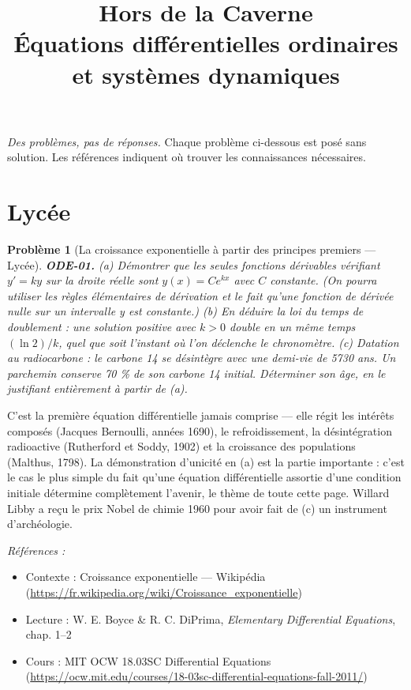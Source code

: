 \documentclass[11pt]{article}
\title{Hors de la Caverne \\ \Large Équations différentielles ordinaires et systèmes dynamiques}
\author{}
\date{}
\newtheorem{problem}{Problème}
\newenvironment{refs}{\par\small\noindent\emph{Références :}\begin{itemize}\setlength\itemsep{0pt}}{\end{itemize}\normalsize}
\begin{document}
\maketitle
\noindent\emph{Des problèmes, pas de réponses.} Chaque problème ci-dessous est posé
sans solution. Les références indiquent où trouver les connaissances nécessaires.
\medskip


\section*{Lycée}

\begin{problem}[{La croissance exponentielle à partir des principes premiers --- Lycée}]
\textbf{ODE-01.} (a) Démontrer que les \textit{seules} fonctions dérivables
vérifiant $ y' = k y $ sur la droite réelle sont $ y(x) = C e^{kx} $ avec $ C $ constante.
(On pourra utiliser les règles élémentaires de dérivation et le fait qu'une fonction de dérivée
nulle sur un intervalle y est constante.)
(b) En déduire la loi du temps de doublement : une solution positive avec $ k >0 $ double en
un même temps $ (\ln 2)/k $, quel que soit l'instant où l'on déclenche le chronomètre.
(c) Datation au radiocarbone : le carbone 14 se désintègre avec une demi-vie de 5730 ans. Un
parchemin conserve 70 \% de son carbone 14 initial. Déterminer son âge, en le justifiant
entièrement à partir de (a).
\end{problem}

\noindent C'est la première équation différentielle jamais comprise --- elle régit les
intérêts composés (Jacques Bernoulli, années 1690), le refroidissement, la désintégration
radioactive (Rutherford et Soddy, 1902) et la croissance des populations (Malthus, 1798). La
démonstration d'unicité en (a) est la partie importante : c'est le cas le plus simple du fait
qu'une équation différentielle assortie d'une condition initiale détermine complètement l'avenir,
le thème de toute cette page. Willard Libby a reçu le prix Nobel de chimie 1960 pour avoir fait
de (c) un instrument d'archéologie.

\begin{refs}
\item Contexte : Croissance exponentielle --- Wikipédia (\url{https://fr.wikipedia.org/wiki/Croissance_exponentielle})
\item Lecture : W. E. Boyce \& R. C. DiPrima, \textit{Elementary Differential Equations}, chap. 1--2
\item Cours : MIT OCW 18.03SC Differential Equations (\url{https://ocw.mit.edu/courses/18-03sc-differential-equations-fall-2011/})
\end{refs}
\end{document}
